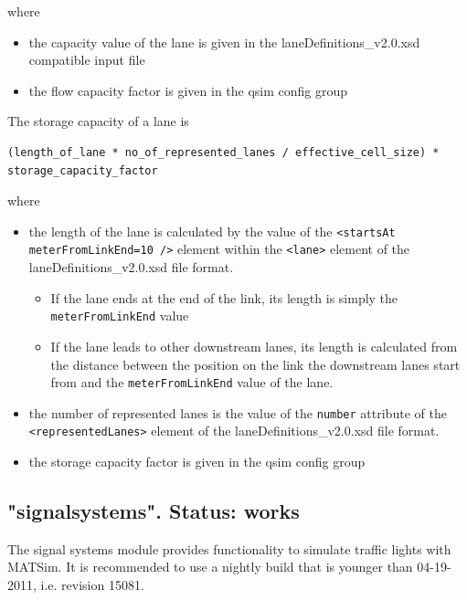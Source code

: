where
\begin{itemize}
	\item the capacity value of the lane is given in the laneDefinitions\_v2.0.xsd compatible input file
	\item the flow capacity factor is given in the qsim config group
\end{itemize}

The storage capacity of a lane is

\begin{lstlisting}
(length_of_lane * no_of_represented_lanes / effective_cell_size) * storage_capacity_factor
\end{lstlisting}

where
\begin{itemize}
	\item the length of the lane is calculated by the value of the \verb$<startsAt meterFromLinkEnd=10 />$ element within the \verb$<lane>$ element of the laneDefinitions\_v2.0.xsd file format. \\
		\begin{itemize}
			\item If the lane ends at the end of the link, its length is simply the \verb$meterFromLinkEnd$ value
			\item If the lane leads to other downstream lanes, its length is calculated from the distance between the position on the link the downstream lanes start from and the \verb$meterFromLinkEnd$ value of the lane. 
		\end{itemize}
	\item the number of represented lanes is the value of the \verb$number$ attribute of the  \verb$<representedLanes>$ element of the laneDefinitions\_v2.0.xsd file format.
	\item the storage capacity factor is given in the qsim config group
\end{itemize}


\umbruch
\subsection{"signalsystems". Status: works}


The signal systems module provides functionality to simulate traffic  lights with MATSim. It is recommended to use a nightly build that is  younger than 04-19-2011, i.e. revision 15081.

